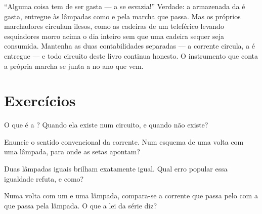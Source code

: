\begin{remark}\label{rem:g7:circuits-series-parallel:whyhard}
``Alguma coisa tem de ser gasta --- a  se esvazia!'' Verdade: a
\emph{} armazenada da  é gasta, entregue às lâmpadas como
 e  pela marcha que passa. Mas os próprios marchadores
circulam ilesos, como as cadeiras de um teleférico levando
esquiadores morro acima o dia inteiro sem que uma cadeira sequer seja
consumida. Mantenha as duas contabilidades separadas --- a corrente
circula, a  é entregue --- e todo circuito deste livro
continua honesto. O instrumento que conta a própria marcha se junta a
 no ano que vem.
\end{remark}

\section{Exercícios}

\begin{exercise}[$\star$]\label{exo:g7:circuits-series-parallel:1}
O que é a ? Quando ela existe num circuito, e quando
não existe?
\end{exercise}

\begin{exercise}[$\star$]\label{exo:g7:circuits-series-parallel:2}
Enuncie o sentido convencional da corrente. Num esquema de uma volta
com uma lâmpada, para onde as setas apontam?
\end{exercise}

\begin{exercise}[$\star$]\label{exo:g7:circuits-series-parallel:3}
Duas lâmpadas iguais  brilham exatamente igual. Qual erro
popular essa igualdade refuta, e como?
\end{exercise}

\begin{exercise}[$\star$]\label{exo:g7:circuits-series-parallel:4}
Numa volta  com um  e uma lâmpada, compara-se a corrente
que passa pelo  com a que passa pela lâmpada. O que a lei da
série diz?
\end{exercise}

